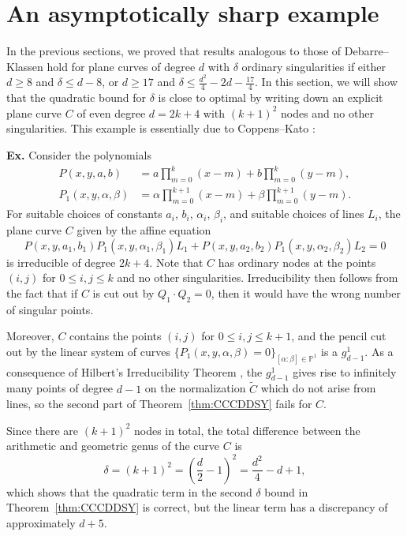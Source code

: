 \documentclass[fontsize=11pt,reqno]{amsart}
\theoremstyle{definition}
\theoremstyle{remark}
\newcommand{\tC}{\widetilde{C}}
\renewcommand{\P}{\mathbb{P}}
\begin{document}
    

\section{An asymptotically sharp example}

In the previous sections, we proved that results analogous to those of Debarre--Klassen \cite{DK94} hold for plane curves of degree $d$ with $\delta$ ordinary singularities if either $d\geq 8$ and $\delta \leq d-8$, or $d \geq 17$ and $\delta \leq \frac{d^2}{4} - 2d - \frac{17}{4}$. In this section, we will show that the quadratic bound for $\delta$ is close to optimal by writing down an explicit plane curve $C$ of even degree $d = 2k+4$ with $(k+1)^{2}$ nodes and no other singularities. This example is essentially due to Coppens--Kato \cite[Example 5.1]{CK91}:

\textbf{Ex.} Consider the polynomials
\begin{align*}
P(x, y, a, b) &= a \prod_{m=0}^{k} (x-m) + b \prod_{m=0}^{k} (y-m), \\
P_{1}(x, y, \alpha, \beta) &= \alpha \prod_{m=0}^{k+1} (x-m) + \beta \prod_{m=0}^{k+1} (y-m).
\end{align*}
For suitable choices of constants $a_{i}$, $b_{i}$, $\alpha_{i}$, $\beta_{i}$, and suitable choices of lines $L_{i}$, the plane curve $C$ given by the affine equation
\[ P(x,y,a_1,b_1) P_{1}(x,y,\alpha_1,\beta_1) L_{1} + P(x,y,a_2,b_2) P_{1}(x,y,\alpha_2,\beta_2) L_{2} = 0 \]
is irreducible of degree $2k+4$. Note that $C$ has ordinary nodes at the points $(i, j)$ for $0 \leq i, j \leq k$ and no other singularities. Irreducibility then follows from the fact that if $C$ is cut out by $Q_{1} \cdot Q_{2} = 0$, then it would have the wrong number of singular points.

Moreover, $C$ contains the points $(i, j)$ for $0 \leq i, j \leq k+1$, and the pencil cut out by the linear system of curves $\{ P_{1}(x, y, \alpha, \beta) = 0 \}_{[\alpha:\beta] \in \P^1}$ is a $g^{1}_{d-1}$. As a consequence of Hilbert's Irreducibility Theorem \cite[Corollary 2.8]{VV24}, the $g^{1}_{d-1}$ gives rise to infinitely many points of degree $d-1$ on the normalization $\tC$ which do not arise from lines, so the second part of Theorem~\ref{thm:CCCDDSY} fails for $C$.

Since there are $(k+1)^{2}$ nodes in total, the total difference between the arithmetic and geometric genus of the curve $C$ is
\[ \delta = (k+1)^{2} = \left( \frac{d}{2} - 1 \right)^{2} = \frac{d^{2}}{4} - d + 1, \]
which shows that the quadratic term in the second $\delta$ bound in Theorem~\ref{thm:CCCDDSY} is correct, but the linear term has a discrepancy of approximately $d + 5$.
\end{document}
